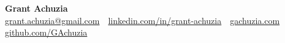 \begin{center}
    \textbf{\Huge Grant Achuzia} \\ \vspace{1pt}
    {\small
        \href{mailto:grant.achuzia@gmail.com}{grant.achuzia@gmail.com} \,\textbar\,
        \href{https://www.linkedin.com/in/grant-achuzia/}{linkedin.com/in/grant-achuzia} \,\textbar\,
        \href{https://gachuzia.com/}{gachuzia.com} \,\textbar\,
        \href{https://github.com/GAchuzia}{github.com/GAchuzia}%
    }

\end{center}
